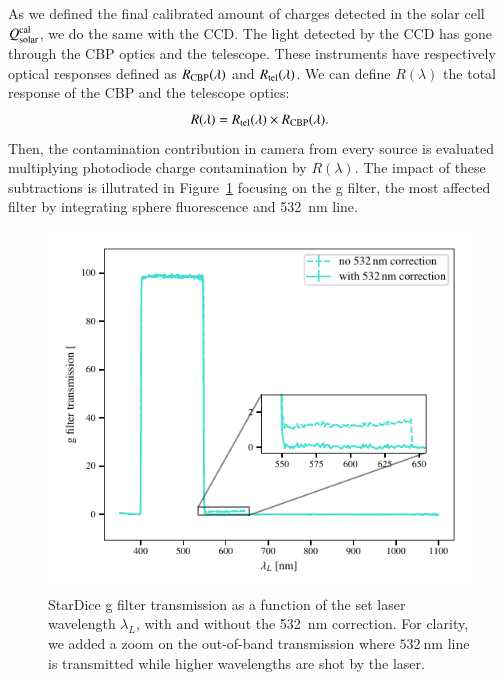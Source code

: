 As we defined the final calibrated amount of charges detected in the solar cell $Q_{\mathrm{solar}}^{\mathrm{cal}}$, we do the same with the \SD CCD. The light detected by the \SD CCD has gone through the CBP optics and the \SD telescope. These instruments have respectively optical responses defined as $R_{\mathrm{CBP}}(\lambda)$ and $R_{\mathrm{tel}}(\lambda)$. We can define $R(\lambda)$ the total response of the CBP and the \SD telescope optics:
\begin{equation}
    R(\lambda) = R_{\mathrm{tel}}(\lambda) \times R_{\mathrm{CBP}}(\lambda).
    \label{eq:rtot}
\end{equation}
Then, the contamination contribution in \SD camera from every source is evaluated multiplying photodiode charge contamination by $R(\lambda)$.
The impact of these subtractions is illutrated in Figure~\ref{fig:g_filter_532} focusing on the \SD g filter, the most affected filter by integrating sphere fluorescence and \SI{532}{\nano\meter} line.

\begin{figure}[h]
    \centering
    \includegraphics[width=\columnwidth]{fig/g_filter_532.pdf}
    \caption{StarDice g filter transmission as a function of the set laser wavelength $\lambda_L$, with and without the \SI{532}{\nm} correction. For clarity, we added a zoom on the out-of-band transmission where $\SI{532}{\nm}$ line is transmitted while higher wavelengths are shot by the laser.}
    \label{fig:g_filter_532}
\end{figure}

